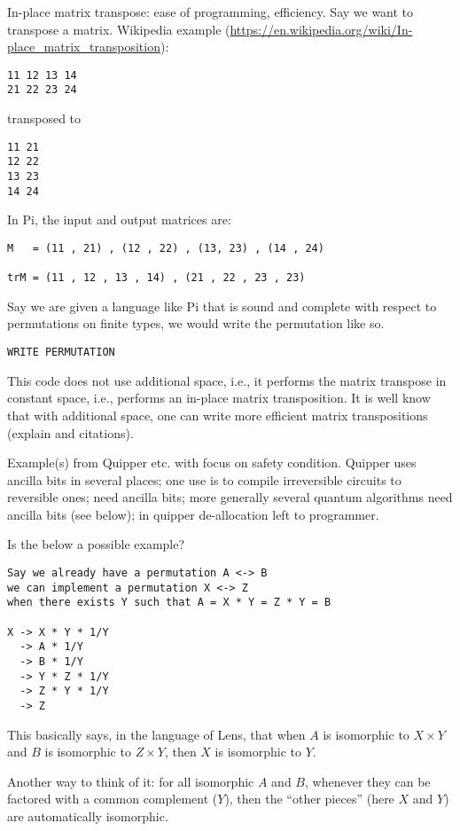 \documentclass[sigplan,10pt,review,anonymous]{acmart}
\begin{document}
In-place matrix transpose: ease of programming, efficiency. Say we
want to transpose a matrix. Wikipedia example
(\url{https://en.wikipedia.org/wiki/In-place_matrix_transposition}):
\begin{verbatim}
11 12 13 14 
21 22 23 24 
\end{verbatim}
transposed to
\begin{verbatim}
11 21
12 22
13 23
14 24
\end{verbatim}
In Pi, the input and output matrices are:
\begin{verbatim}
M   = (11 , 21) , (12 , 22) , (13, 23) , (14 , 24) 

trM = (11 , 12 , 13 , 14) , (21 , 22 , 23 , 23) 
\end{verbatim}
Say we are given a language like Pi that is sound and complete with
respect to permutations on finite types, we would write the
permutation like so.
\begin{verbatim}
WRITE PERMUTATION
\end{verbatim}
This code does not use additional space, i.e., it performs the matrix
transpose in constant space, i.e., performs an in-place matrix
transposition. It is well know that with additional space, one can
write more efficient matrix transpositions (explain and citations).

Example(s) from Quipper etc. with focus on safety condition. Quipper
uses ancilla bits in several places; one use is to compile
irreversible circuits to reversible ones; need ancilla bits; more
generally several quantum algorithms need ancilla bits (see below); in
quipper de-allocation left to programmer.

Is the below a possible example?
\begin{verbatim}
Say we already have a permutation A <-> B
we can implement a permutation X <-> Z 
when there exists Y such that A = X * Y = Z * Y = B

X -> X * Y * 1/Y 
  -> A * 1/Y
  -> B * 1/Y
  -> Y * Z * 1/Y
  -> Z * Y * 1/Y
  -> Z
\end{verbatim}
This basically says, in the language of Lens, that
when $A$ is isomorphic to $X \times Y$ and
$B$ is isomorphic to $Z \times Y$, then
$X$ is isomorphic to $Y$.

Another way to think of it: for all isomorphic
$A$ and $B$, whenever they can be factored with a
common complement ($Y$), then the ``other pieces''
(here $X$ and $Y$) are automatically isomorphic.

\end{document}
